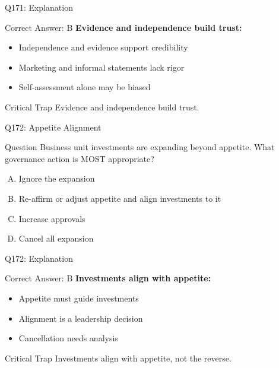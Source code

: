 \documentclass{beamer}
\begin{document}
	\begin{frame}{Q171: Explanation}
		\begin{block}{Correct Answer: B}
			\textbf{Evidence and independence build trust:}
			\begin{itemize}
				\item Independence and evidence support credibility
				\item Marketing and informal statements lack rigor
				\item Self-assessment alone may be biased
			\end{itemize}
		\end{block}
		\begin{alertblock}{Critical Trap}
			Evidence and independence build trust.
		\end{alertblock}
	\end{frame}
	
	\begin{frame}{Q172: Appetite Alignment}
		\begin{block}{Question}
			Business unit investments are expanding beyond appetite. What governance action is MOST appropriate?
		\end{block}
		\begin{enumerate}[(A)]
			\item Ignore the expansion
			\item Re-affirm or adjust appetite and align investments to it
			\item Increase approvals
			\item Cancel all expansion
		\end{enumerate}
	\end{frame}
	
	\begin{frame}{Q172: Explanation}
		\begin{block}{Correct Answer: B}
			\textbf{Investments align with appetite:}
			\begin{itemize}
				\item Appetite must guide investments
				\item Alignment is a leadership decision
				\item Cancellation needs analysis
			\end{itemize}
		\end{block}
		\begin{alertblock}{Critical Trap}
			Investments align with appetite, not the reverse.
		\end{alertblock}
	\end{frame}
	
\end{document}
